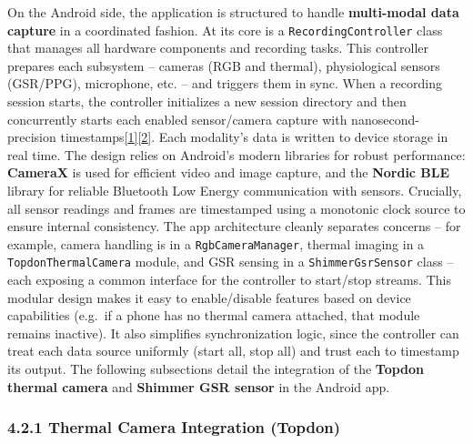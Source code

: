 \documentclass[12pt,a4paper]{article}
\begin{document}
On the Android side, the application is structured to handle \textbf{multi-modal data capture} in a coordinated fashion. At its core is a \passthrough{\lstinline!RecordingController!} class that manages all hardware components and recording tasks. This controller prepares each subsystem -- cameras (RGB and thermal), physiological sensors (GSR/PPG), microphone, etc. -- and triggers them in sync. When a recording session starts, the controller initializes a new session directory and then concurrently starts each enabled sensor/camera capture with nanosecond-precision timestamps\href{https://github.com/buccancs/GSR-Dual-Video-System/blob/05ae360cb7b4ae7c7861f72deb235ad64a74b38e/android/app/src/main/java/com/yourcompany/gsrcapture/controller/RecordingController.kt\#L36-L45}{{[}1{]}}\href{https://github.com/buccancs/GSR-Dual-Video-System/blob/05ae360cb7b4ae7c7861f72deb235ad64a74b38e/android/app/src/main/java/com/yourcompany/gsrcapture/controller/RecordingController.kt\#L51-L59}{{[}2{]}}. Each modality's data is written to device storage in real time. The design relies on Android's modern libraries for robust performance: \textbf{CameraX} is used for efficient video and image capture, and the \textbf{Nordic BLE} library for reliable Bluetooth Low Energy communication with sensors. Crucially, all sensor readings and frames are timestamped using a monotonic clock source to ensure internal consistency. The app architecture cleanly separates concerns -- for example, camera handling is in a \passthrough{\lstinline!RgbCameraManager!}, thermal imaging in a \passthrough{\lstinline!TopdonThermalCamera!} module, and GSR sensing in a \passthrough{\lstinline!ShimmerGsrSensor!} class -- each exposing a common interface for the controller to start/stop streams. This modular design makes it easy to enable/disable features based on device capabilities (e.g.~if a phone has no thermal camera attached, that module remains inactive). It also simplifies synchronization logic, since the controller can treat each data source uniformly (start all, stop all) and trust each to timestamp its output. The following subsections detail the integration of the \textbf{Topdon thermal camera} and \textbf{Shimmer GSR sensor} in the Android app.

\subsubsection{4.2.1 Thermal Camera Integration (Topdon)}\label{thermal-camera-integration-topdon}
\end{document}

